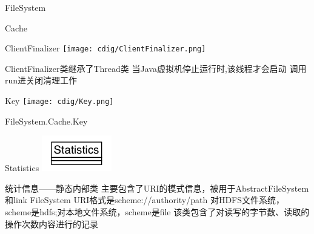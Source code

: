 \begin{XeClass}{FileSystem}
\begin{XeInnerClass}{Cache}
        \begin{XeInnerClass}{ClientFinalizer}
\texttt{[image: cdig/ClientFinalizer.png]}
             
 ClientFinalizer类继承了Thread类
 当Java虚拟机停止运行时,该线程才会启动
 调用run进关闭清理工作

        \end{XeInnerClass}
        \begin{XeInnerClass}{Key}
\texttt{[image: cdig/Key.png]}
             
 FileSystem.Cache.Key

        \end{XeInnerClass}
    \end{XeInnerClass}
    \begin{XeInnerClass}{Statistics}
\includegraphics[width=\textwidth]{cdig/Statistics.png}
         
 统计信息——静态内部类
 主要包含了URI的模式信息，被用于AbstractFileSystem和link FileSystem
 URI格式是scheme://authority/path
 对HDFS文件系统，scheme是hdfs;对本地文件系统，scheme是file
 该类包含了对读写的字节数、读取的操作次数内容进行的记录

    \end{XeInnerClass}
\end{XeClass}
